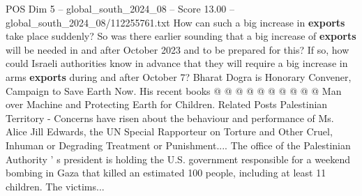 \begin{textsample}{POS Dim 5 – global\_south\_2024\_08 – Score 13.00 – global\_south\_2024\_08/112255761.txt}
How can such a big increase in \textbf{exports} take place suddenly?
So was there earlier sounding that a big increase of \textbf{exports} will be needed in and after October 2023 and to be prepared for this?
If so, how could Israeli authorities know in advance that they will require a big increase in arms \textbf{exports} during and after October 7?
Bharat Dogra is Honorary Convener, Campaign to Save Earth Now.
His recent books @ @ @ @ @ @ @ @ @ @ Man over Machine and Protecting Earth for Children.
Related Posts Palestinian Territory - Concerns have risen about the behaviour and performance of Ms.
Alice Jill Edwards, the UN Special Rapporteur on Torture and Other Cruel, Inhuman or Degrading Treatment or Punishment....
The office of the Palestinian Authority ' s president is holding the U.S. government responsible for a weekend bombing in Gaza that killed an estimated 100 people, including at least 11 children.
The victims...

\end{textsample}
